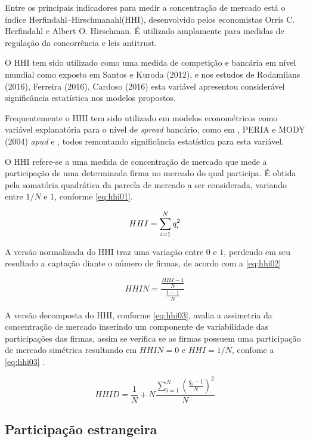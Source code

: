 \documentclass[
  12pt,
  12pt,
  openright,
  oneside,
  a4paper,
  chapter=TITLE,
  section=TITLE,
  subsection=TITLE,
  subsubsection=TITLE,
  english,
  portugues,
  sumario=tradicional]{abntex2}
\begin{document}
Entre os principais indicadores para medir a concentração de mercado está o índice Herfindahl--Hirschmanahl(HHI), desenvolvido pelos economistas Orris C. Herfindahl e Albert O. Hirschman. É utilizado amplamente para medidas de regulação da concorrência e leis antitrust.

O HHI tem sido utilizado como uma medida de competição e bancária em nível mundial como exposto em Santos e Kuroda (2012), e nos estudos de Rodamilans (2016), Ferreira (2016), Cardoso (2016) esta variável apresentou considerável significância estatística nos modelos propostos.

Frequentemente o HHI tem sido utilizado em modelos econométricos como variável explanatória para o nível de \emph{spread} bancário, como em \textcite{dantas:2012}, PERIA e MODY (2004) \emph{apud} \textcite{leal:2006} e \textcite{almeida:2013}, todos remontando significância estatística para esta variável.

O HHI refere-se a uma medida de concentração de mercado que mede a participação de uma determinada firma no mercado do qual participa. É obtida pela somatória quadrática da parcela de mercado a ser considerada, variando entre \(1/N\) e \(1\), conforme \autoref{eq:hhi01}.

\begin{equation}\label{eq:hhi01}
HHI = \sum_{i=1}^{N}q_i^2
\vspace{10pt}
\end{equation}

A versão normalizada do HHI traz uma variação entre \(0\) e \(1\), perdendo em seu resultado a captação diante o número de firmas, de acordo com a \autoref{eq:hhi02}

\begin{equation}\label{eq:hhi02}
HHIN = \frac{\frac{HHI - 1}{N}}{\frac{1-1}{N}}
\end{equation}

A versão decomposta do HHI, conforme \autoref{eq:hhi03}, avalia a assimetria da concentração de mercado inserindo um componente de variabilidade das participações das firmas, assim se verifica se as firmas possuem uma participação de mercado simétrica resultando em \(HHIN = 0\) e \(HHI= 1/N\), confome a \autoref{eq:hhi03}
.

\begin{equation}\label{eq:hhi03}
HHID = \frac{1}{N} + N\frac{\sum_{i=1}^{N}(\frac{q_i - 1}{N})^2}{N}
\end{equation}

\subsection{Participação estrangeira}
\end{document}
